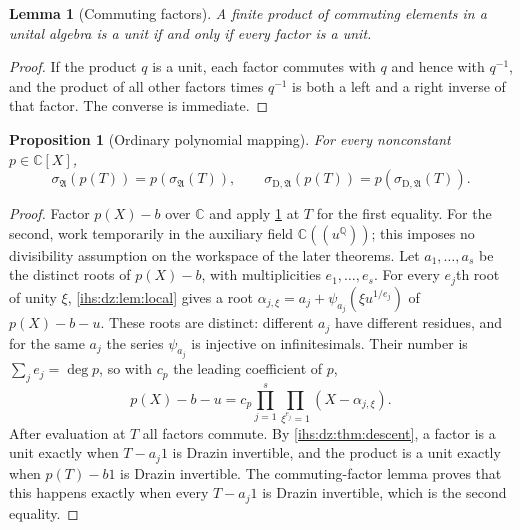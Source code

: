 \documentclass[11pt,a4paper]{article}
\numberwithin{equation}{section}
\newtheorem{proposition}[proposition]{Proposition}
\newtheorem{lemma}[lemma]{Lemma}
\theoremstyle{definition}
\theoremstyle{remark}
\newcommand{\C}{\mathbb C}
\newcommand{\Q}{\mathbb Q}
\newcommand{\Alg}{\mathfrak A}
\newcommand{\sigD}{\sigma_{\mathrm D,\Alg}}
\begin{document}
\begin{lemma}[Commuting factors]\label{ihs:dz:lem:commuting}
A finite product of commuting elements in a unital algebra is a unit if and
only if every factor is a unit.
\end{lemma}
\begin{proof}
If the product $q$ is a unit, each factor commutes with $q$ and hence with
$q^{-1}$, and the product of all other factors times $q^{-1}$ is both a left
and a right inverse of that factor. The converse is immediate.
\end{proof}

\begin{proposition}[Ordinary polynomial mapping]\label{ihs:dz:prop:ordinarymapping}
For every nonconstant $p\in\C[X]$,
\begin{equation}\label{ihs:dz:eq:ordinarymapping}
 \sigma_\Alg(p(T))=p(\sigma_\Alg(T)),\qquad \sigD(p(T))=p(\sigD(T)).
\end{equation}
\end{proposition}
\begin{proof}
Factor $p(X)-b$ over $\C$ and apply \cref{ihs:dz:lem:commuting} at $T$ for
the first equality. For the second, work temporarily in the auxiliary field
$\C((u^\Q))$; this imposes no divisibility assumption on the workspace of the
later theorems. Let $a_1,\ldots,a_s$ be the distinct roots of $p(X)-b$, with
multiplicities $e_1,\ldots,e_s$. For every $e_j$th root of unity $\xi$,
\cref{ihs:dz:lem:local} gives a root $\alpha_{j,\xi}=a_j+\psi_{a_j}(\xi
u^{1/e_j})$ of $p(X)-b-u$. These roots are distinct: different $a_j$ have
different residues, and for the same $a_j$ the series $\psi_{a_j}$ is
injective on infinitesimals. Their number is $\sum_je_j=\deg p$, so with
$c_p$ the leading coefficient of $p$,
\[
 p(X)-b-u=c_p\prod_{j=1}^s\prod_{\xi^{e_j}=1}(X-\alpha_{j,\xi}).
\]
After evaluation at $T$ all factors commute. By \cref{ihs:dz:thm:descent}, a
factor is a unit exactly when $T-a_j1$ is Drazin invertible, and the product
is a unit exactly when $p(T)-b1$ is Drazin invertible. The commuting-factor
lemma proves that this happens exactly when every $T-a_j1$ is Drazin
invertible, which is the second equality.
\end{proof}
\end{document}
